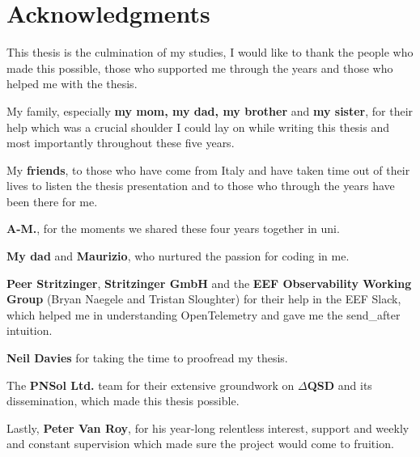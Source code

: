 \chapter*{Acknowledgments}
    This thesis is the culmination of my studies, I would like to thank the people who made this possible, those who supported me through the years and those who helped me with the thesis.
    
    \forceindent My family, especially \textbf{my mom, my dad, my brother} and \textbf{my sister}, for their help which was a crucial shoulder I could lay on while writing this thesis and most importantly throughout these five years.
    
    \forceindent My \textbf{friends}, to those who have come from Italy and have taken time out of their lives to listen the thesis presentation and to those who through the years have been there for me. 

    \forceindent \textbf{A-M.}, for the moments we shared these four years together in uni.

    \forceindent \textbf{My dad} and \textbf{Maurizio}, who nurtured the passion for coding in me.
    
    \forceindent \textbf{Peer Stritzinger}, \textbf{Stritzinger GmbH} and the \textbf{EEF Observability Working Group} (Bryan Naegele and Tristan Sloughter) for their help in the EEF Slack, which helped me in understanding OpenTelemetry and gave me the send\_after intuition.

    \forceindent \textbf{Neil Davies} for taking the time to proofread my thesis.

    \forceindent The \textbf{PNSol Ltd.} team for their extensive groundwork on \textbf{$\Delta$QSD} and its dissemination, which made this thesis possible.

    \forceindent Lastly, \textbf{Peter Van Roy}, for his year-long relentless interest, support and weekly and constant supervision which made sure the project would come to fruition. 

